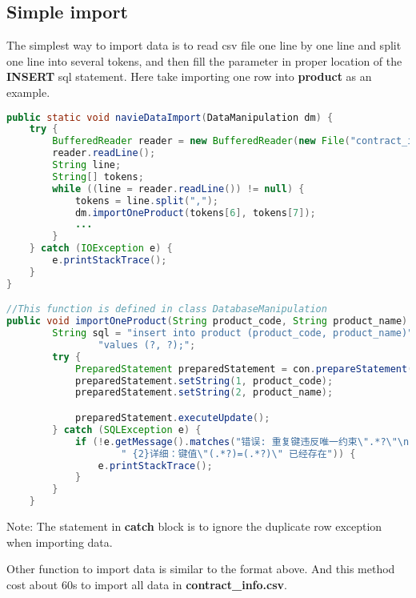 \documentclass[onecolumn, oneside, ctexart, UTF8, b4paper]{SUSTechHomework}
\begin{document}
\subsection{\textbf{Simple import}}
The simplest way to import data is to read csv file one line by one line and split one line into several tokens, and then fill the parameter in proper location of the \textbf{INSERT} sql statement. Here take importing one row into \textbf{product} as an example.
\begin{lstlisting}[language=Java]
public static void navieDataImport(DataManipulation dm) {
    try {
        BufferedReader reader = new BufferedReader(new File("contract_info.csv"));
        reader.readLine();
        String line;
        String[] tokens;
        while ((line = reader.readLine()) != null) {
            tokens = line.split(",");
            dm.importOneProduct(tokens[6], tokens[7]);
            ...
        }
    } catch (IOException e) {
        e.printStackTrace();
    }
}

//This function is defined in class DatabaseManipulation
public void importOneProduct(String product_code, String product_name) {
        String sql = "insert into product (product_code, product_name)" +
                "values (?, ?);";
        try {
            PreparedStatement preparedStatement = con.prepareStatement(sql);
            preparedStatement.setString(1, product_code);
            preparedStatement.setString(2, product_name);

            preparedStatement.executeUpdate();
        } catch (SQLException e) {
            if (!e.getMessage().matches("错误: 重复键违反唯一约束\".*?\"\n" +
                    " {2}详细：键值\"(.*?)=(.*?)\" 已经存在")) {
                e.printStackTrace();
            }
        }
    }
\end{lstlisting}
Note: The statement in \textbf{catch} block is to ignore the duplicate row exception when importing data.

Other function to import data is similar to the format above. And this method cost about 60s to import all data in \textbf{contract\_info.csv}.
\end{document}
